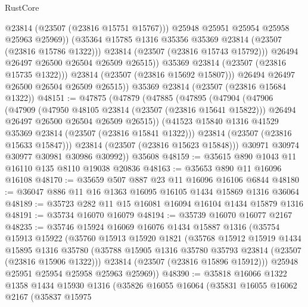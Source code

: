 \begin{lexlean}{RustCore}
\begin{coremodule}
                        @23814
                        (@23507 (@23816 @15751 @15767)))
                      @25948
                      @25951
                      @25954
                      @25958
                      @25963
                      @25969))
                  (@35364 @15785 @1316 @35356 @35369 @23814 (@23507 (@23816 @15786 @1322)))
                  @23814
                  (@23507 (@23816 @15743 @15792)))
                @26494
                @26497
                @26500
                @26504
                @26509
                @26515))
            @35369
            @23814
            (@23507 (@23816 @15735 @1322)))
          @23814
          (@23507 (@23816 @15692 @15807)))
        @26494
        @26497
        @26500
        @26504
        @26509
        @26515))
    @35369
    @23814
    (@23507 (@23816 @15684 @1322))
@48151 := @47875
    (@47879
      (@47885
        (@47895
          (@47904
            (@47906
              (@47909
                (@47950 @48105 @23814 (@23507 (@23816 @15641 @15822)))
                @26494
                @26497
                @26500
                @26504
                @26509
                @26515))
            (@41523 @15840 @1316 @41529 @35369 @23814 (@23507 (@23816 @15841 @1322)))
            @23814
            (@23507 (@23816 @15633 @15847)))
          @23814
          (@23507 (@23816 @15623 @15848)))
        @30971
        @30974
        @30977
        @30981
        @30986
        @30992))
    @35608
@48159 := @35615 @890 @1043 @11 @16110 @135 @8110 @19038 @20836
@48163 := @35653 @890 @11 @16096 @16108
@48170 := @35659 @507 @887 @23 @11 @16096 @16106 @6844
@48180 := @36047 @886 @11 @16 @1363 @16095 @16105 @1434 @15869 @1316 @36064
@48189 := @35723 @282 @11 @15 @16081 @16094 @16104 @1434 @15879 @1316
@48191 := @35734 @16070 @16079
@48194 := @35739 @16070 @16077 @2167
@48235 := @35746
    @15924
    @16069
    @16076
    @1434
    @15887
    @1316
    (@35754
      @15913
      @15922
      (@35760
        @15913
        @15920
        @1821
        (@35768
          @15912
          @15919
          @1434
          @15895
          @1316
          @35780
          (@35788 @15905 @1316 @35780 @35793 @23814 (@23507 (@23816 @15906 @1322)))
          @23814
          (@23507 (@23816 @15896 @15912)))
        @25948
        @25951
        @25954
        @25958
        @25963
        @25969))
@48390 := @35818
    @16066
    @1322
    @1358
    @1434
    @15930
    @1316
    (@35826
      @16055
      @16064
      (@35831
        @16055
        @16062
        @2167
        (@35837
          @15975

\end{coremodule}
\end{lexlean}
